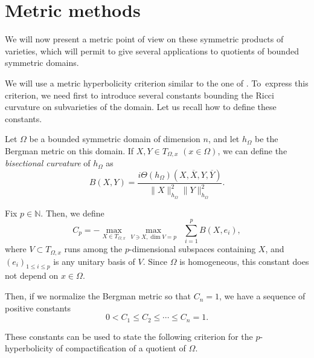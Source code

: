 \documentclass[JEP,XML,SOM,Unicode, NoEqCountersInSection,NoFloatCountersInSection,published]{cedram}
\theoremstyle{theorem}
\theoremstyle{definition}
\begin{document}
\section{Metric methods}\label{sec:metric}

We will now present a metric point of view on these symmetric products of varieties, which will permit to give several applications to quotients of bounded symmetric domains.

We will use a metric hyperbolicity criterion similar to the one of \cite{cad18}. To~express this criterion, we need first to introduce several constants bounding the Ricci curvature on subvarieties of the domain. Let us recall how to define these constants.

Let $\Omega$ be a bounded symmetric domain of dimension $n$, and let $h_{\Omega}$ be the Bergman metric on this domain. If $X, Y \in T_{\Omega, x}$ $(x \in \Omega)$, we can define the \emph{bisectional curvature} of $h_{\Omega}$ as
\[
B(X, Y) = \frac{i\Theta(h_{\Omega})(X, \overline{X}, Y, \overline{Y})}{\|X\|_{h_{\Omega}}^2 \|Y\|_{h_{\Omega}}^2}.
\]

Fix $p \in \mathbb N$. Then, we define
\begin{equation} \label{eqCp}
C_{p} = - \max_{X \in T_{\Omega, x}} \max_{V \ni X, \dim V = p} \;\; \sum_{i = 1}^p B(X, e_i),
\end{equation}
where $V \subset T_{\Omega, x}$ runs among the $p$-dimensional subspaces containing $X$, and $(e_i)_{1 \leq i \leq p}$ is any unitary basis of $V$. Since $\Omega$ is homogeneous, this constant does not depend on $x \in \Omega$.

Then, if we normalize the Bergman metric so that $C_{n} = 1$, we have a sequence of positive constants
\[
0 < C_1 \leq C_2 \leq \cdots \leq C_n = 1.
\]

These constants can be used to state the following criterion for the $p$-hyperbolicity of compactification of a quotient of $\Omega$.
\end{document}
